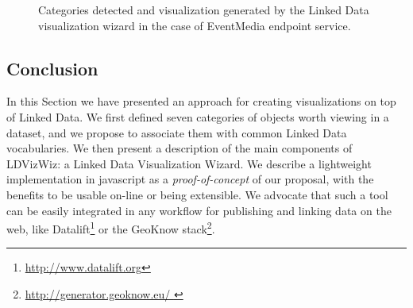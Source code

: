 \begin{figure}[!htbp]
\begin{center}


\caption{Categories detected and visualization generated by the Linked Data visualization wizard in the case of EventMedia endpoint service.}
\label{fig:visuSample}
\end{center}
\end{figure}


\subsection{Conclusion}
\label{sec:conclusion-wizard}
In this Section we have presented  an approach for creating visualizations on top of Linked Data. We first defined seven categories of objects worth viewing in a dataset, and we propose to associate them with common Linked Data vocabularies. We then present a description of the main components of LDVizWiz: a Linked Data Visualization Wizard. We describe a lightweight implementation in javascript as a \textit{proof-of-concept} of our proposal, with the benefits to be usable on-line or being extensible. We advocate that such a tool can be easily integrated  in any workflow for publishing and linking data on the web, like Datalift\footnote{\url{http://www.datalift.org}} or the GeoKnow stack\footnote{\url{ http://generator.geoknow.eu/ }}. 

